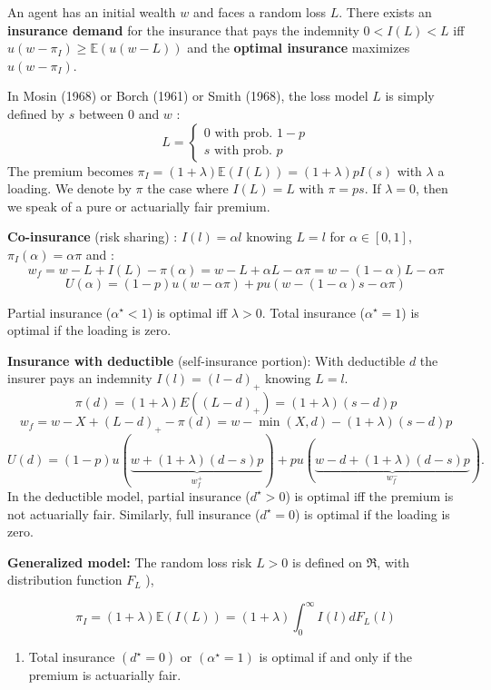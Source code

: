 \begin{f}
	
An agent has an initial wealth \(w\) and faces a random loss \(L\). There exists an \textbf{insurance demand} for the insurance that pays the indemnity $0<I(L)<L$ iff $u(w-\pi_I) \geq \mathbb{E}(u(w-L))$ and the \textbf{optimal insurance} maximizes $u(w-\pi_I)$.

In Mosin (1968) or Borch (1961) or Smith (1968), the loss model $L$ is simply defined by $s$ between 0 and \(w\) :
	$$
	L=\left\{\begin{array}{l}
		0 \text { with prob. } 1-p \\
		s \text { with prob. } p
	\end{array}\right.
	$$
The premium becomes $\pi_I=(1+\lambda) \mathbb{E}(I(L))=(1+\lambda) p I(s)$ with $\lambda$ a loading. We denote by $\pi$ the case where $I(L)=L$ with $\pi= p s$. If $\lambda=0$, then we speak of a pure or actuarially fair premium.
\medskip

\textbf{Co-insurance} (risk sharing) :
$I(l)=\alpha l$ knowing $L=l$ for $\alpha \in[0,1]$, $\pi_I(\alpha)=\alpha \pi$ and :
$$
w_{f}=w-L+I(L)-\pi(\alpha)=w-L+\alpha L-\alpha \pi=w-(1-\alpha) L-\alpha \pi
$$
$$
U(\alpha)%
=(1-p) u(w-\alpha \pi)+p u(w-(1-\alpha) s-\alpha \pi)
$$

Partial insurance ($\alpha^{\star}<1$) is optimal iff $\lambda>0$. Total insurance ($\alpha^{\star}=1$) is optimal if the loading is zero.
\medskip

\textbf{Insurance with deductible} (self-insurance portion):
With deductible $d$ the insurer pays an indemnity $I(l)=(l-d)_{+}$ knowing $L=l$.
$$
\pi(d)=(1+\lambda) E\left((L-d)_{+}\right)=(1+\lambda)(s-d) p
$$
$$
w_{f}=w-X+(L-d)_{+}-\pi(d)=w-\min (X, d)-(1+\lambda)(s-d) p
$$
$$
U(d)=(1-p) u(\underbrace{w+(1+\lambda)(d-s) p}_{w_{f}^{+}})+p u(\underbrace{w-d+(1+\lambda)(d-s) p}_{w_{f}^{-}}) .
$$
In the deductible model, partial insurance ($d^{\star}>0$) is optimal iff the premium is not actuarially fair. Similarly, full insurance ($d^{\star}=0$) is optimal if the loading is zero.
\medskip

\textbf{Generalized model:}
The random loss risk $L>0$ is defined on $\Re$, with distribution function $F_L$ ),

$$
\pi_I=(1+\lambda) \mathbb{E}(I(L))=(1+\lambda) \int_{0}^{\infty} I(l) d F_{L}(l)
$$



\begin{enumerate}
	\item Total insurance \((d^\star = 0)\) or \((\alpha^\star = 1)\) is optimal if and only if the premium is actuarially fair.
	

\end{enumerate}
\end{f}
